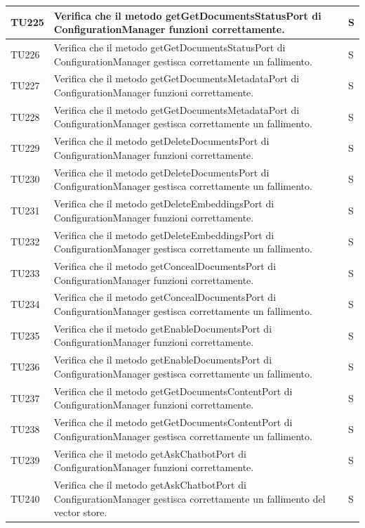 \documentclass[10pt, a4paper]{article}
\begin{document}
\begin{xltabular}{\textwidth}{p{0.12\textwidth}|p{0.7\textwidth}|X}
TU225 & Verifica che il metodo getGetDocumentsStatusPort di ConfigurationManager funzioni correttamente. & S \\
\hline
TU226 & Verifica che il metodo getGetDocumentsStatusPort di ConfigurationManager gestisca correttamente un fallimento. & S \\
\hline
TU227 & Verifica che il metodo getGetDocumentsMetadataPort di ConfigurationManager funzioni correttamente. & S \\
\hline
TU228 & Verifica che il metodo getGetDocumentsMetadataPort di ConfigurationManager gestisca correttamente un fallimento. & S \\
\hline
TU229 & Verifica che il metodo getDeleteDocumentsPort di ConfigurationManager funzioni correttamente. & S \\
\hline
TU230 & Verifica che il metodo getDeleteDocumentsPort di ConfigurationManager gestisca correttamente un fallimento. & S \\
\hline
TU231 & Verifica che il metodo getDeleteEmbeddingsPort di ConfigurationManager funzioni correttamente. & S \\
\hline
TU232 & Verifica che il metodo getDeleteEmbeddingsPort di ConfigurationManager gestisca correttamente un fallimento. & S \\
\hline
TU233 & Verifica che il metodo getConcealDocumentsPort di ConfigurationManager funzioni correttamente. & S \\
\hline
TU234 & Verifica che il metodo getConcealDocumentsPort di ConfigurationManager gestisca correttamente un fallimento. & S \\
\hline
TU235 & Verifica che il metodo getEnableDocumentsPort di ConfigurationManager funzioni correttamente. & S \\
\hline
TU236 & Verifica che il metodo getEnableDocumentsPort di ConfigurationManager gestisca correttamente un fallimento. & S \\
\hline
TU237 & Verifica che il metodo getGetDocumentsContentPort di ConfigurationManager funzioni correttamente. & S \\
\hline
TU238 & Verifica che il metodo getGetDocumentsContentPort di ConfigurationManager gestisca correttamente un fallimento. & S \\
\hline
TU239 & Verifica che il metodo getAskChatbotPort di ConfigurationManager funzioni correttamente. & S \\
\hline
TU240 & Verifica che il metodo getAskChatbotPort di ConfigurationManager gestisca correttamente un fallimento del vector store. & S \\

\end{xltabular}
\end{document}
